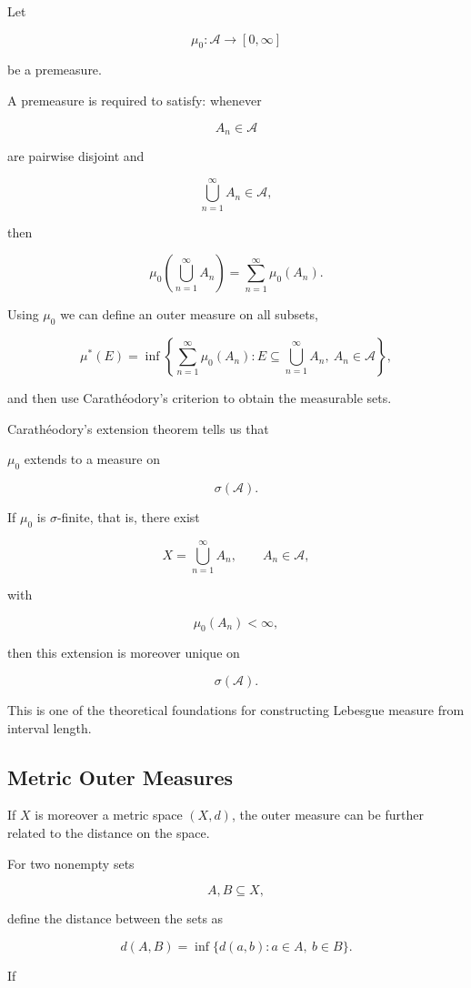 \documentclass[11pt]{article}
\begin{document}
Let

\[
\mu_{0}:\mathcal{A}\rightarrow[0,\infty]
\]

be a premeasure.

A premeasure is required to satisfy: whenever

\[
A_{n}\in\mathcal{A}
\]

are pairwise disjoint and

\[
\bigcup_{n=1}^{\infty}A_{n}\in\mathcal{A},
\]

then

\[
\mu_{0}\left(\bigcup_{n=1}^{\infty}A_{n}\right)=\sum_{n=1}^{\infty}\mu_{0}(A_{n}).
\]

Using $\mu_{0}$ we can define an outer measure on all subsets,

\[
\mu^{*}(E)=\inf\left\{\sum_{n=1}^{\infty}\mu_{0}(A_{n}):E\subseteq\bigcup_{n=1}^{\infty}A_{n},\ A_{n}\in\mathcal{A}\right\},
\]

and then use Carathéodory's criterion to obtain the measurable sets.

Carathéodory's extension theorem tells us that

$\mu_{0}$ extends to a measure on

\[
\sigma(\mathcal{A}).
\]

If $\mu_{0}$ is $\sigma$-finite, that is, there exist

\[
X=\bigcup_{n=1}^{\infty}A_{n},\qquad A_{n}\in\mathcal{A},
\]

with

\[
\mu_{0}(A_{n})<\infty,
\]

then this extension is moreover unique on

\[
\sigma(\mathcal{A}).
\]

This is one of the theoretical foundations for constructing Lebesgue measure from interval length.

\subsection{Metric Outer Measures}

If $X$ is moreover a metric space $(X,d)$, the outer measure can be further related to the distance on the space.

For two nonempty sets

\[
A,B\subseteq X,
\]

define the distance between the sets as

\[
d(A,B)=\inf\{d(a,b):a\in A,\ b\in B\}.
\]

If
\end{document}
